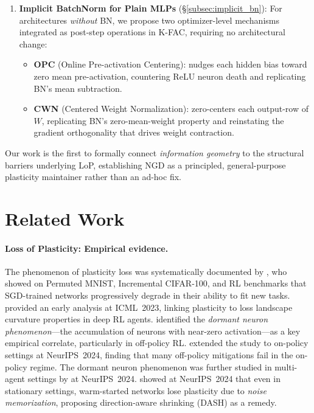 \documentclass{article}
\theoremstyle{plain}
\theoremstyle{definition}
\theoremstyle{remark}
\begin{document}
\begin{enumerate}
    \item \textbf{Implicit BatchNorm for Plain MLPs} (\S\ref{subsec:implicit_bn}): For architectures \emph{without} BN, we propose two optimizer-level mechanisms integrated as post-step operations in K-FAC, requiring no architectural change:
    \begin{itemize}
        \item \textbf{OPC} (Online Pre-activation Centering): nudges each hidden bias toward zero mean pre-activation, countering ReLU neuron death and replicating BN's mean subtraction.
        \item \textbf{CWN} (Centered Weight Normalization): zero-centers each output-row of $W$, replicating BN's zero-mean-weight property and reinstating the gradient orthogonality that drives weight contraction.
    \end{itemize}
\end{enumerate}

Our work is the first to formally connect \emph{information geometry} to the structural barriers underlying LoP, establishing NGD as a principled, general-purpose plasticity maintainer rather than an ad-hoc fix.

\section{Related Work}
\label{sec:related}

\paragraph{Loss of Plasticity: Empirical evidence.}
The phenomenon of plasticity loss was systematically documented by \citet{dohare2024loss}, who showed on Permuted MNIST, Incremental CIFAR-100, and RL benchmarks that SGD-trained networks progressively degrade in their ability to fit new tasks. \citet{lyle2023understanding} provided an early analysis at ICML~2023, linking plasticity to loss landscape curvature properties in deep RL agents. \citet{sokar2023dormant} identified the \emph{dormant neuron phenomenon}---the accumulation of neurons with near-zero activation---as a key empirical correlate, particularly in off-policy RL. \citet{juliani2024plasticity} extended the study to on-policy settings at NeurIPS~2024, finding that many off-policy mitigations fail in the on-policy regime. The dormant neuron phenomenon was further studied in multi-agent settings by \citet{qin2024reborn} at NeurIPS~2024. \citet{shin2024dash} showed at NeurIPS~2024 that even in stationary settings, warm-started networks lose plasticity due to \emph{noise memorization}, proposing direction-aware shrinking (DASH) as a remedy.
\end{document}
